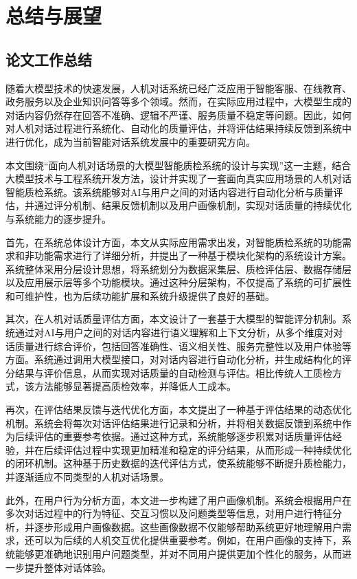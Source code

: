 \chapter{总结与展望}
\section{论文工作总结}
随着大模型技术的快速发展，人机对话系统已经广泛应用于智能客服、在线教育、政务服务以及企业知识问答等多个领域。然而，在实际应用过程中，大模型生成的对话内容仍然存在回答不准确、逻辑不严谨、服务质量不稳定等问题。因此，如何对人机对话过程进行系统化、自动化的质量评估，并将评估结果持续反馈到系统中进行优化，成为当前智能对话系统发展中的重要研究方向。

本文围绕“面向人机对话场景的大模型智能质检系统的设计与实现”这一主题，结合大模型技术与工程系统开发方法，设计并实现了一套面向真实应用场景的人机对话智能质检系统。该系统能够对AI与用户之间的对话内容进行自动化分析与质量评估，并通过评分机制、结果反馈机制以及用户画像机制，实现对话质量的持续优化与系统能力的逐步提升。

首先，在系统总体设计方面，本文从实际应用需求出发，对智能质检系统的功能需求和非功能需求进行了详细分析，并提出了一种基于模块化架构的系统设计方案。系统整体采用分层设计思想，将系统划分为数据采集层、质检评估层、数据存储层以及应用展示层等多个功能模块。通过这种分层架构，不仅提高了系统的可扩展性和可维护性，也为后续功能扩展和系统升级提供了良好的基础。

其次，在人机对话质量评估方面，本文设计了一套基于大模型的智能评分机制。系统通过对AI与用户之间的对话内容进行语义理解和上下文分析，从多个维度对对话质量进行综合评价，包括回答准确性、语义相关性、服务完整性以及用户体验等方面。系统通过调用大模型接口，对对话内容进行自动化分析，并生成结构化的评分结果与评价信息，从而实现对话质量的自动检测与评估。相比传统人工质检方式，该方法能够显著提高质检效率，并降低人工成本。

再次，在评估结果反馈与迭代优化方面，本文提出了一种基于评估结果的动态优化机制。系统会将每次对话评估结果进行记录和分析，并将相关数据反馈到系统中作为后续评估的重要参考依据。通过这种方式，系统能够逐步积累对话质量评估经验，并在后续评估过程中实现更加精准和稳定的评分结果，从而形成一种持续优化的闭环机制。这种基于历史数据的迭代评估方式，使系统能够不断提升质检能力，并逐渐适应不同类型的人机对话场景。

此外，在用户行为分析方面，本文进一步构建了用户画像机制。系统会根据用户在多次对话过程中的行为特征、交互习惯以及问题类型等信息，对用户进行特征分析，并逐步形成用户画像数据。这些画像数据不仅能够帮助系统更好地理解用户需求，还可以为后续的人机交互优化提供重要参考。例如，在用户画像的支持下，系统能够更准确地识别用户问题类型，并对不同用户提供更加个性化的服务，从而进一步提升整体对话体验。

